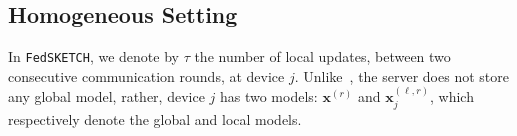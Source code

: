 \documentclass[sigconf, anonymous, review]{acmart}
\begin{document}
\subsection{Homogeneous Setting}
In \texttt{FedSKETCH}, we denote by $\tau$ the number of local updates, between two consecutive communication rounds, at device $j$.
 Unlike~\citep{haddadpour2020federated}, the server does not store any global model, rather, device $j$ has two models: $\boldsymbol{x}^{(r)}$ and $\boldsymbol{x}^{(\ell,r)}_j$, which respectively denote the global and local models. 
%
\end{document}
